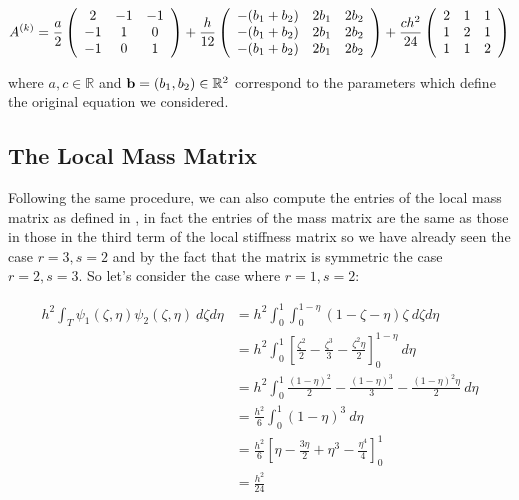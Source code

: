 \begin{equation}\label{eq:twod-local-stiffness}
 A^{(k)} =
    \frac{a}{2}\left(\begin{array}{c c c}
         2 & -1 & -1 \\
        -1 &  1 &  0 \\
        -1 &  0 &  1
    \end{array}\right)
    + \frac{h}{12} \left(\begin{array}{c c c}
        -(b_1 + b_2) & 2b_1 & 2b_2 \\
        -(b_1 + b_2) & 2b_1  & 2b_2 \\
        -(b_1 + b_2) & 2b_1  & 2b_2
    \end{array}\right)
    + \frac{ch^2}{24}\left(\begin{array}{c c c}
         2 &  1 &  1 \\
         1 &  2 &  1 \\
         1 &  1 &  2
      \end{array}\right)
\end{equation}

where $a, c \in \mathbb{R}$ and $\mathbf{b} = (b_1, b_2) \in \mathbb{R}^2$
correspond to the parameters which define the original equation
 we considered.

\subsection{The Local Mass Matrix}

Following the same procedure, we can also compute the entries of the local mass
matrix as defined in , in fact the
entries of the mass matrix are the same as those in those in the third term of
the local stiffness matrix so we have already seen the case $r = 3, s = 2$ and
by the fact that the matrix is symmetric the case $r = 2, s = 3$. So let's
consider the case where $r = 1, s = 2$:

\begin{align*}
    h^2\int_T\psi_1(\zeta,\eta)\psi_2(\zeta,\eta)\ d\zeta d\eta
    &=  h^2\int_0^1\int_0^{1-\eta}(1 - \zeta -\eta)\zeta\ d\zeta d\eta \\
    &= h^2\int_0^1\left[\frac{\zeta^2}{2} -\frac{\zeta^3}{3}
                        -\frac{\zeta^2\eta}{2}\right]_0^{1-\eta}\  d\eta \\
    &= h^2\int_0^1\frac{(1-\eta)^2}{2} - \frac{(1-\eta)^3}{3}- \frac{(1-\eta)^2\eta}{2}\ d\eta \\
    &= \frac{h^2}{6}\int_0^1(1- \eta)^3\ d\eta \\
    &= \frac{h^2}{6}\left[\eta -\frac{3\eta}{2} + \eta^3 - \frac{\eta^4}{4}\right]_0^1 \\
    &= \frac{h^2}{24}
\end{align*}

